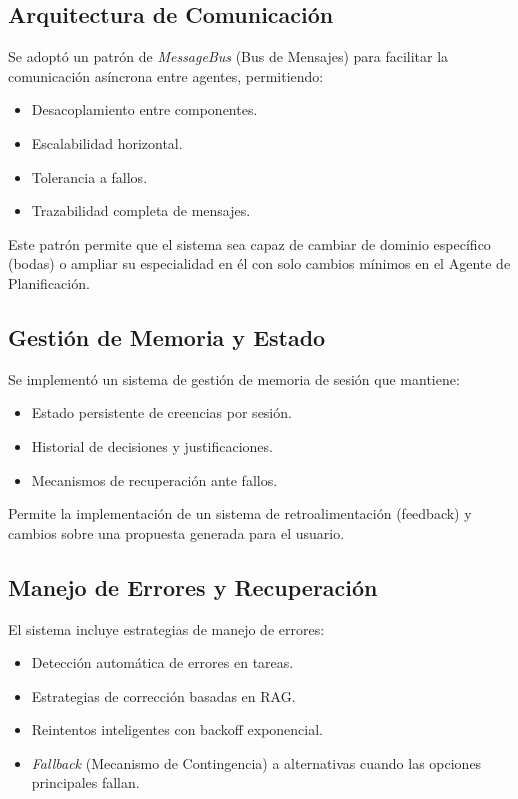 \documentclass[runningheads,a4paper]{llncs}
\begin{document}
\subsection{Arquitectura de Comunicación}

Se adoptó un patrón de \textit{MessageBus} (Bus de Mensajes) para facilitar la comunicación asíncrona entre agentes, 
permitiendo:

\begin{itemize}
    \item Desacoplamiento entre componentes.
    \item Escalabilidad horizontal.
    \item Tolerancia a fallos.
    \item Trazabilidad completa de mensajes.
\end{itemize}

Este patrón permite que el sistema sea capaz de cambiar de dominio específico (bodas) o ampliar su especialidad en él con 
solo cambios mínimos en el Agente de Planificación.

\subsection{Gestión de Memoria y Estado}

Se implementó un sistema de gestión de memoria de sesión que mantiene:

\begin{itemize}
    \item Estado persistente de creencias por sesión.
    \item Historial de decisiones y justificaciones.
    \item Mecanismos de recuperación ante fallos.
\end{itemize}

Permite la implementación de un sistema de retroalimentación (feedback) y cambios sobre una propuesta generada para el 
usuario.

\subsection{Manejo de Errores y Recuperación}

El sistema incluye estrategias de manejo de errores:

\begin{itemize}
    \item Detección automática de errores en tareas.
    \item Estrategias de corrección basadas en RAG.
    \item Reintentos inteligentes con backoff exponencial.
    \item \textit{Fallback} (Mecanismo de Contingencia) a alternativas cuando las opciones principales fallan.
\end{itemize}
\end{document}
